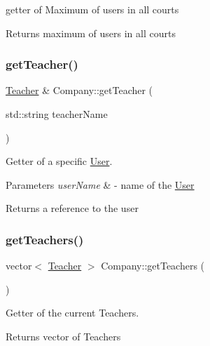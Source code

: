 getter of Maximum of users in all courts 

\begin{DoxyReturn}{Returns}
maximum of users in all courts 
\end{DoxyReturn}
\mbox{\label{class_company_a7867ccfc2961810389f118feb827e63e}} 
\subsubsection{\texorpdfstring{get\+Teacher()}{getTeacher()}}
{\footnotesize\ttfamily \mbox{\hyperlink{class_teacher}{Teacher}} \& Company\+::get\+Teacher (\begin{DoxyParamCaption}\item[{std\+::string}]{teacher\+Name }\end{DoxyParamCaption})}



Getter of a specific \mbox{\hyperlink{class_user}{User}}. 


\begin{DoxyParams}{Parameters}
{\em user\+Name} & -\/ name of the \mbox{\hyperlink{class_user}{User}} \\
\hline
\end{DoxyParams}
\begin{DoxyReturn}{Returns}
a reference to the user 
\end{DoxyReturn}
\mbox{\label{class_company_a000159ce012318a6edf0335447ad8bde}} 
\subsubsection{\texorpdfstring{get\+Teachers()}{getTeachers()}}
{\footnotesize\ttfamily vector$<$ \mbox{\hyperlink{class_teacher}{Teacher}} $>$ Company\+::get\+Teachers (\begin{DoxyParamCaption}{ }\end{DoxyParamCaption})}



Getter of the current Teachers. 

\begin{DoxyReturn}{Returns}
vector of Teachers 
\end{DoxyReturn}
\mbox{\label{class_company_a314cbc50e394b65f3b07670855029eef}} 

